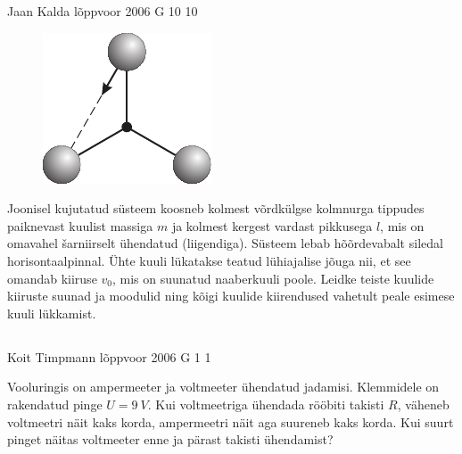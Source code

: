 \documentclass[11pt, twoside]{article}
\begin{document}
{%
{Jaan Kalda} %
{lõppvoor} %
{2006} %
{G 10} %
{10} %
{
\ifStatement
\begin{figure}
	\begin{center}
		\vspace{-25pt}
		\includegraphics[width=\linewidth]{2006-v3g-10-yl}
	\end{center}
\end{figure}
Joonisel kujutatud süsteem koosneb kolmest võrdkülgse kolmnurga tippudes paiknevast kuulist massiga $m$ ja kolmest kergest vardast pikkusega $l$, mis on omavahel šarniirselt ühendatud (liigendiga). Süsteem lebab hõõrdevabalt siledal horisontaalpinnal. Ühte kuuli lükatakse teatud lühiajalise jõuga nii, et see omandab kiiruse $v_0$, mis on suunatud naaberkuuli poole. Leidke teiste kuulide kiiruste suunad ja moodulid ning kõigi kuulide kiirendused vahetult peale esimese kuuli lükkamist.
\fi
}
\newpage\subsection{\protect{}}

{Koit Timpmann} %
{lõppvoor} %
{2006} %
{G 1} %
{1} %
{
\ifStatement
Vooluringis on ampermeeter ja voltmeeter ühendatud jadamisi. Klemmidele on rakendatud pinge $U = \SI{9}{V}$. Kui voltmeetriga ühendada rööbiti takisti $R$, väheneb voltmeetri näit kaks korda, ampermeetri näit aga suureneb kaks korda. Kui suurt pinget näitas voltmeeter enne ja pärast takisti ühendamist?

}}
\end{document}
